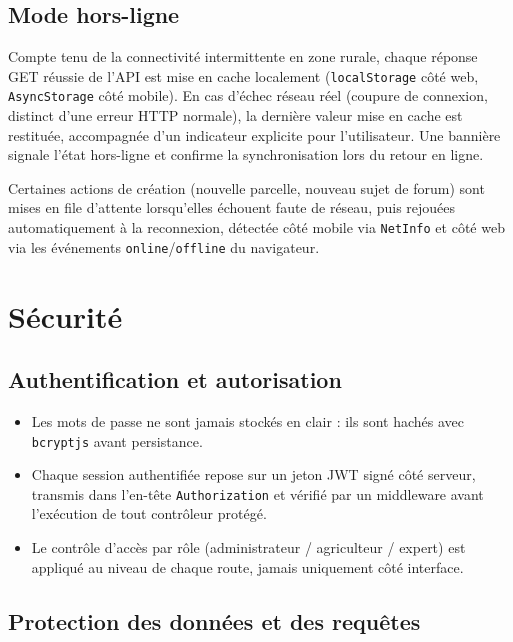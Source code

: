 \documentclass[12pt,a4paper]{report}
\begin{document}
\section{Mode hors-ligne}

Compte tenu de la connectivité intermittente en zone rurale, chaque réponse GET réussie de l'API est mise en cache localement (\texttt{localStorage} côté web, \texttt{AsyncStorage} côté mobile). En cas d'échec réseau réel (coupure de connexion, distinct d'une erreur HTTP normale), la dernière valeur mise en cache est restituée, accompagnée d'un indicateur explicite pour l'utilisateur. Une bannière signale l'état hors-ligne et confirme la synchronisation lors du retour en ligne.

Certaines actions de création (nouvelle parcelle, nouveau sujet de forum) sont mises en file d'attente lorsqu'elles échouent faute de réseau, puis rejouées automatiquement à la reconnexion, détectée côté mobile via \texttt{NetInfo} et côté web via les événements \texttt{online}/\texttt{offline} du navigateur.

\chapter{Sécurité}
\label{chap:securite}

\section{Authentification et autorisation}

\begin{itemize}
    \item Les mots de passe ne sont jamais stockés en clair : ils sont hachés avec \texttt{bcryptjs} avant persistance.
    \item Chaque session authentifiée repose sur un jeton JWT signé côté serveur, transmis dans l'en-tête \texttt{Authorization} et vérifié par un middleware avant l'exécution de tout contrôleur protégé.
    \item Le contrôle d'accès par rôle (administrateur / agriculteur / expert) est appliqué au niveau de chaque route, jamais uniquement côté interface.
\end{itemize}

\section{Protection des données et des requêtes}
\end{document}

